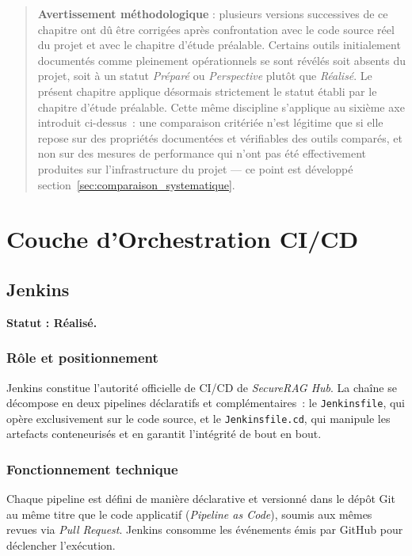 \begin{quote}
\textbf{Avertissement méthodologique} : plusieurs versions successives de ce chapitre ont dû être corrigées après confrontation avec le code source réel du projet et avec le chapitre d'étude préalable. Certains outils initialement documentés comme pleinement opérationnels se sont révélés soit absents du projet, soit à un statut \textit{Préparé} ou \textit{Perspective} plutôt que \textit{Réalisé}. Le présent chapitre applique désormais strictement le statut établi par le chapitre d'étude préalable. Cette même discipline s'applique au sixième axe introduit ci-dessus~: une comparaison critériée n'est légitime que si elle repose sur des propriétés documentées et vérifiables des outils comparés, et non sur des mesures de performance qui n'ont pas été effectivement produites sur l'infrastructure du projet — ce point est développé section~\ref{sec:comparaison_systematique}.
\end{quote}

\section{Couche d'Orchestration CI/CD}

\subsection{Jenkins}
\textbf{Statut : Réalisé.}

\subsubsection{Rôle et positionnement}
Jenkins constitue l'autorité officielle de CI/CD de \textit{SecureRAG Hub}. La chaîne se décompose en deux pipelines déclaratifs et complémentaires~: le \texttt{Jenkinsfile}, qui opère exclusivement sur le code source, et le \texttt{Jenkinsfile.cd}, qui manipule les artefacts conteneurisés et en garantit l'intégrité de bout en bout.

\subsubsection{Fonctionnement technique}
Chaque pipeline est défini de manière déclarative et versionné dans le dépôt Git au même titre que le code applicatif (\textit{Pipeline as Code}), soumis aux mêmes revues via \textit{Pull Request}. Jenkins consomme les événements émis par GitHub pour déclencher l'exécution.

